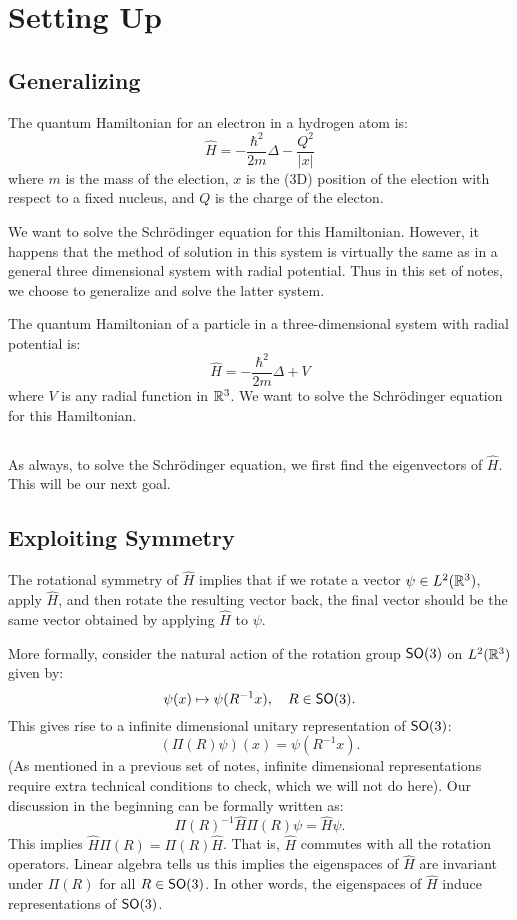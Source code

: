 \section{Setting Up}

\subsection{Generalizing}
The quantum Hamiltonian for an electron in a hydrogen atom is:
\[
    \hat{H} = - \frac{\hbar^2}{2m}\Delta - \frac{Q^2}{|x|}
\]
where $m$ is the mass of the election, $x$ is the (3D) position of the election with respect to a fixed nucleus, and $Q$ is the charge of the electon.

We want to solve the Schr\"{o}dinger equation for this Hamiltonian. However, it happens that the method of solution in this system is virtually the same as in a general three dimensional system with radial potential. Thus in this set of notes, we choose to generalize and solve the latter system.

The quantum Hamiltonian of a particle in a three-dimensional system with radial potential is:
\[
    \hat{H} = - \frac{\hbar^2}{2m}\Delta + V
\]
where $V$ is any radial function in ${\mathbb R}^3$. We want to solve the Schr\"{o}dinger equation for this Hamiltonian.

\subsection{}
As always, to solve the Schr\"{o}dinger equation, we first find the eigenvectors of $\hat{H}$. This will be our next goal.

\subsection{Exploiting Symmetry}
The rotational symmetry of $\hat{H}$ implies that if we rotate a vector $\psi \in L^2({\mathbb R}^3)$, apply $\hat{H}$, and then rotate the resulting vector back, the final vector should be the same vector obtained by applying $\hat{H}$ to $\psi$.

More formally, consider the natural action of the rotation group $\operatorname{\textsf{SO}}(3)$ on $L^2({\mathbb R}^3)$ given by:
\[
    \psi(x) \mapsto \psi(R^{-1}x), \quad R \in \operatorname{\textsf{SO}}(3).
\]
This gives rise to a infinite dimensional unitary representation of $\operatorname{\textsf{SO}}(3)$:
\[
    (\Pi(R)\psi)(x) = \psi(R^{-1}x).
\]
(As mentioned in a previous set of notes, infinite dimensional representations require extra technical conditions to check, which we will not do here). Our discussion in the beginning can be formally written as:
\[
    \Pi(R)^{-1}\hat{H}\Pi(R)\psi = \hat{H}\psi.
\]
This implies $\hat{H}\Pi(R) = \Pi(R)\hat{H}$. That is, $\hat{H}$ commutes with all the rotation operators. Linear algebra tells us this implies the eigenspaces of $\hat{H}$ are invariant under $\Pi(R)$ for all $R \in \operatorname{\textsf{SO}}(3)$. In other words, the eigenspaces of $\hat{H}$ induce representations of $\operatorname{\textsf{SO}}(3)$.

